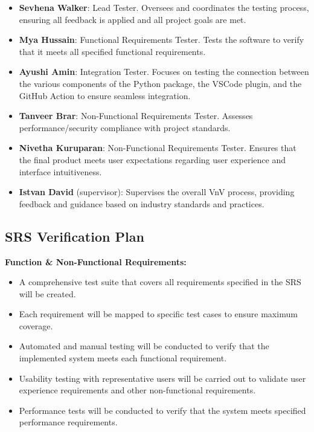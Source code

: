 \documentclass[12pt, titlepage]{article}
\begin{document}
\begin{itemize}
  \item \textbf{Sevhena Walker}: Lead Tester. Oversees and
    coordinates the testing process, ensuring all feedback is applied
    and all project goals are met.
  \item \textbf{Mya Hussain}: Functional Requirements Tester. Tests
    the software to verify that it meets all specified functional requirements.
  \item \textbf{Ayushi Amin}: Integration Tester. Focuses on testing
    the connection between the various components of the Python
    package, the VSCode plugin, and the GitHub Action to ensure
    seamless integration.
  \item \textbf{Tanveer Brar}: Non-Functional Requirements Tester.
    Assesses performance/security compliance with project standards.
  \item \textbf{Nivetha Kuruparan}: Non-Functional Requirements
    Tester. Ensures that the final product meets user expectations
    regarding user experience and interface intuitiveness.
  \item \textbf{Istvan David} (supervisor): Supervises the overall
    VnV process, providing feedback and guidance based on industry
    standards and practices.
\end{itemize}

\subsection{SRS Verification Plan}

\textbf{Function \& Non-Functional Requirements:}
\begin{itemize}
  \item A comprehensive test suite that covers all requirements
    specified in the SRS will be created.
  \item Each requirement will be mapped to specific test cases to
    ensure maximum coverage.
  \item Automated and manual testing will be conducted to verify that
    the implemented system meets each functional requirement.
  \item Usability testing with representative users will be carried
    out to validate user experience requirements and other
    non-functional requirements.
  \item Performance tests will be conducted to verify that the system
    meets specified performance requirements.
\end{itemize}
\end{document}
